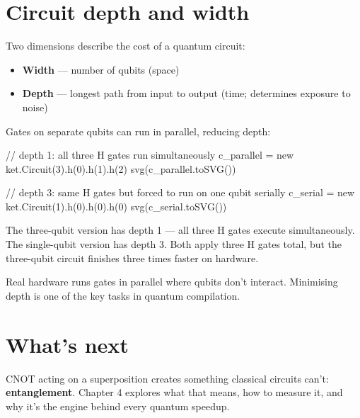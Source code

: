 \documentclass[
  11pt,
  letterpaper,
  oneside]{scrbook}
\newenvironment{Shaded}{\begin{snugshade}}{\end{snugshade}}
\newcommand{\NormalTok}[1]{\textcolor[rgb]{0.00,0.23,0.31}{#1}}
\providecommand{\tightlist}{%
  \setlength{\itemsep}{0pt}\setlength{\parskip}{0pt}}
\begin{document}
\section{Circuit depth and width}\label{circuit-depth-and-width}

Two dimensions describe the cost of a quantum circuit:

\begin{itemize}
\tightlist
\item
  \textbf{Width} --- number of qubits (space)
\item
  \textbf{Depth} --- longest path from input to output (time; determines
  exposure to noise)
\end{itemize}

Gates on separate qubits can run in parallel, reducing depth:

\begin{Shaded}
\begin{Highlighting}[]
\NormalTok{// depth 1: all three H gates run simultaneously}
\NormalTok{c\_parallel = new ket.Circuit(3).h(0).h(1).h(2)}
\NormalTok{svg(c\_parallel.toSVG())}
\end{Highlighting}
\end{Shaded}

\begin{Shaded}
\begin{Highlighting}[]
\NormalTok{// depth 3: same H gates but forced to run on one qubit serially}
\NormalTok{c\_serial = new ket.Circuit(1).h(0).h(0).h(0)}
\NormalTok{svg(c\_serial.toSVG())}
\end{Highlighting}
\end{Shaded}

The three-qubit version has depth 1 --- all three H gates execute
simultaneously. The single-qubit version has depth 3. Both apply three H
gates total, but the three-qubit circuit finishes three times faster on
hardware.

Real hardware runs gates in parallel where qubits don't interact.
Minimising depth is one of the key tasks in quantum compilation.

\section{What's next}\label{whats-next-2}

CNOT acting on a superposition creates something classical circuits
can't: \textbf{entanglement}. Chapter 4 explores what that means, how to
measure it, and why it's the engine behind every quantum speedup.
\end{document}
